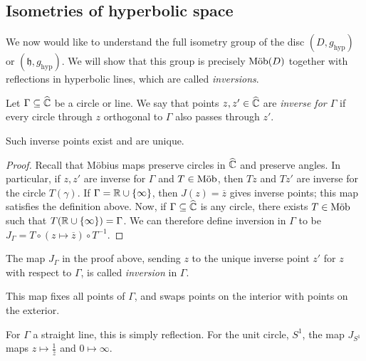 \subsection{Isometries of hyperbolic space}
We now would like to understand the full isometry group of the disc \( (D, g_{\text{hyp}}) \) or \( (\mathfrak{h}, g_{\text{hyp}}) \).
We will show that this group is precisely \( \text{M\"ob}(D) \) together with reflections in hyperbolic lines, which are called \textit{inversions}.
\begin{definition}
	Let \( \Gamma \subseteq \widehat{\mathbb C} \) be a circle or line.
	We say that points \( z, z' \in \widehat{\mathbb C} \) are \textit{inverse for \( \Gamma \)} if every circle through \( z \) orthogonal to \( \Gamma \) also passes through \( z' \).
\end{definition}
\begin{lemma}
	Such inverse points exist and are unique.
\end{lemma}
\begin{proof}
	Recall that M\"obius maps preserve circles in \( \widehat{\mathbb C} \) and preserve angles.
	In particular, if \( z, z' \) are inverse for \( \Gamma \) and \( T \in \text{M\"ob} \), then \( Tz \) and \( Tz' \) are inverse for the circle \( T(\gamma) \).
	If \( \Gamma = \mathbb R \cup \qty{\infty} \), then \( J(z) = \overline z \) gives inverse points; this map satisfies the definition above.
	Now, if \( \Gamma \subseteq \widehat{\mathbb C} \) is any circle, there exists \( T \in \text{M\"ob} \) such that \( T \qty(\mathbb R \cup \qty{\infty}) = \Gamma \).
	We can therefore define inversion in \( \Gamma \) to be \( J_\Gamma = T \circ (z \mapsto \overline z) \circ T^{-1} \).
\end{proof}
\begin{definition}
	The map \( J_\Gamma \) in the proof above, sending \( z \) to the unique inverse point \( z' \) for \( z \) with respect to \( \Gamma \), is called \textit{inversion} in \( \Gamma \).
\end{definition}
This map fixes all points of \( \Gamma \), and swaps points on the interior with points on the exterior.
\begin{example}
	For \( \Gamma \) a straight line, this is simply reflection.
	For the unit circle, \( S^1 \), the map \( J_{S^1} \) maps \( z \mapsto \frac{1}{\overline z} \) and \( 0 \mapsto \infty \).
\end{example}
